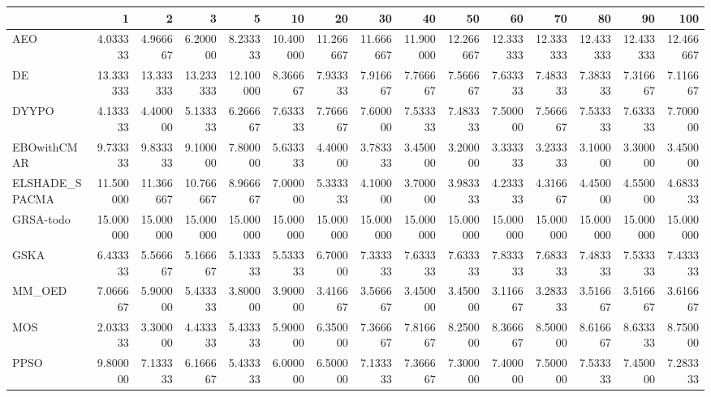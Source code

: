 \begin{tabular}{lrrrrrrrrrrrrrr}
\toprule
{} &        1   &        2   &        3   &        5   &        10  &        20  &        30  &        40  &        50  &        60  &        70  &        80  &        90  &        100 \\
\midrule
AEO            &   4.033333 &   4.966667 &   6.200000 &   8.233333 &  10.400000 &  11.266667 &  11.666667 &  11.900000 &  12.266667 &  12.333333 &  12.333333 &  12.433333 &  12.433333 &  12.466667 \\
DE             &  13.333333 &  13.333333 &  13.233333 &  12.100000 &   8.366667 &   7.933333 &   7.916667 &   7.766667 &   7.566667 &   7.633333 &   7.483333 &   7.383333 &   7.316667 &   7.116667 \\
DYYPO          &   4.133333 &   4.400000 &   5.133333 &   6.266667 &   7.633333 &   7.766667 &   7.600000 &   7.533333 &   7.483333 &   7.500000 &   7.566667 &   7.533333 &   7.633333 &   7.700000 \\
EBOwithCMAR    &   9.733333 &   9.833333 &   9.100000 &   7.800000 &   5.633333 &   4.400000 &   3.783333 &   3.450000 &   3.200000 &   3.333333 &   3.233333 &   3.100000 &   3.300000 &   3.450000 \\
ELSHADE\_SPACMA &  11.500000 &  11.366667 &  10.766667 &   8.966667 &   7.000000 &   5.333333 &   4.100000 &   3.700000 &   3.983333 &   4.233333 &   4.316667 &   4.450000 &   4.550000 &   4.683333 \\
GRSA-todo      &  15.000000 &  15.000000 &  15.000000 &  15.000000 &  15.000000 &  15.000000 &  15.000000 &  15.000000 &  15.000000 &  15.000000 &  15.000000 &  15.000000 &  15.000000 &  15.000000 \\
GSKA           &   6.433333 &   5.566667 &   5.166667 &   5.133333 &   5.533333 &   6.700000 &   7.333333 &   7.633333 &   7.633333 &   7.833333 &   7.683333 &   7.483333 &   7.533333 &   7.433333 \\
MM\_OED         &   7.066667 &   5.900000 &   5.433333 &   3.800000 &   3.900000 &   3.416667 &   3.566667 &   3.450000 &   3.450000 &   3.116667 &   3.283333 &   3.516667 &   3.516667 &   3.616667 \\
MOS            &   2.033333 &   3.300000 &   4.433333 &   5.433333 &   5.900000 &   6.350000 &   7.366667 &   7.816667 &   8.250000 &   8.366667 &   8.500000 &   8.616667 &   8.633333 &   8.750000 \\
PPSO           &   9.800000 &   7.133333 &   6.166667 &   5.433333 &   6.000000 &   6.500000 &   7.133333 &   7.366667 &   7.300000 &   7.400000 &   7.500000 &   7.533333 &   7.450000 &   7.283333 \\

\end{tabular}
